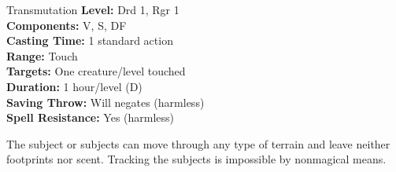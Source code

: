 {Transmutation}
{
	\textbf{Level:}
	Drd 1, Rgr 1\\
	\textbf{Components:}
	V, S, DF\\
	\textbf{Casting Time:}
	1 standard action\\
	\textbf{Range:}
	Touch\\
	\textbf{Targets:}
	One creature/level touched\\
	\textbf{Duration:}
	1 hour/level (D)\\
	\textbf{Saving Throw:}
	Will negates (harmless)\\
	\textbf{Spell Resistance:}
	Yes (harmless)\\
}
{
	The subject or subjects can move through any type of terrain and leave neither footprints nor scent. Tracking the subjects is impossible by nonmagical means.

}
